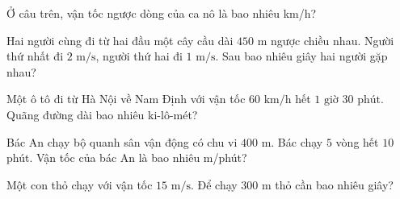 \begin{ex}
  Ở câu trên, vận tốc ngược dòng của ca nô là bao nhiêu km/h?
\end{ex}

\begin{ex}
  Hai người cùng đi từ hai đầu một cây cầu dài $450\text{ m}$ ngược chiều nhau. Người thứ nhất đi $2\text{ m/s}$, người thứ hai đi $1\text{ m/s}$. Sau bao nhiêu giây hai người gặp nhau?
\end{ex}

\begin{ex}
  Một ô tô đi từ Hà Nội về Nam Định với vận tốc $60\text{ km/h}$ hết $1\text{ giờ } 30\text{ phút}$. Quãng đường dài bao nhiêu ki-lô-mét?
\end{ex}

\begin{ex}
  Bác An chạy bộ quanh sân vận động có chu vi $400\text{ m}$. Bác chạy $5$ vòng hết $10$ phút. Vận tốc của bác An là bao nhiêu m/phút?
\end{ex}

\begin{ex}
  Một con thỏ chạy với vận tốc $15\text{ m/s}$. Để chạy $300\text{ m}$ thỏ cần bao nhiêu giây?
\end{ex}
